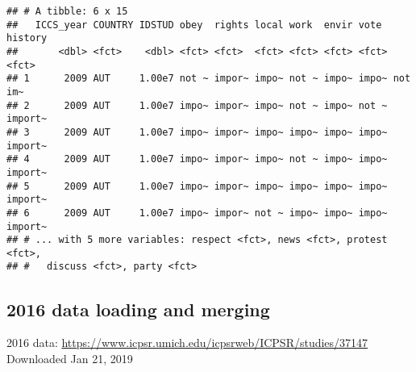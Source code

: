 \documentclass[]{article}
\newenvironment{Shaded}{\begin{snugshade}}{\end{snugshade}}
\newcommand{\DataTypeTok}[1]{\textcolor[rgb]{0.13,0.29,0.53}{#1}}
\newcommand{\KeywordTok}[1]{\textcolor[rgb]{0.13,0.29,0.53}{\textbf{#1}}}
\newcommand{\NormalTok}[1]{#1}
\newcommand{\OperatorTok}[1]{\textcolor[rgb]{0.81,0.36,0.00}{\textbf{#1}}}
\newcommand{\StringTok}[1]{\textcolor[rgb]{0.31,0.60,0.02}{#1}}
\begin{document}
\begin{Shaded}
\end{Shaded}

\begin{verbatim}
## # A tibble: 6 x 15
##   ICCS_year COUNTRY IDSTUD obey  rights local work  envir vote  history
##       <dbl> <fct>    <dbl> <fct> <fct>  <fct> <fct> <fct> <fct> <fct>  
## 1      2009 AUT     1.00e7 not ~ impor~ impo~ not ~ impo~ impo~ not im~
## 2      2009 AUT     1.00e7 impo~ impor~ impo~ not ~ impo~ not ~ import~
## 3      2009 AUT     1.00e7 impo~ impor~ impo~ impo~ impo~ impo~ import~
## 4      2009 AUT     1.00e7 impo~ impor~ impo~ not ~ impo~ impo~ import~
## 5      2009 AUT     1.00e7 impo~ impor~ impo~ impo~ impo~ impo~ import~
## 6      2009 AUT     1.00e7 impo~ impor~ not ~ impo~ impo~ impo~ import~
## # ... with 5 more variables: respect <fct>, news <fct>, protest <fct>,
## #   discuss <fct>, party <fct>
\end{verbatim}

\hypertarget{data-loading-and-merging-1}{%
\subsection{2016 data loading and
merging}\label{data-loading-and-merging-1}}

2016 data:
\url{https://www.icpsr.umich.edu/icpsrweb/ICPSR/studies/37147}
Downloaded Jan 21, 2019
\end{document}

